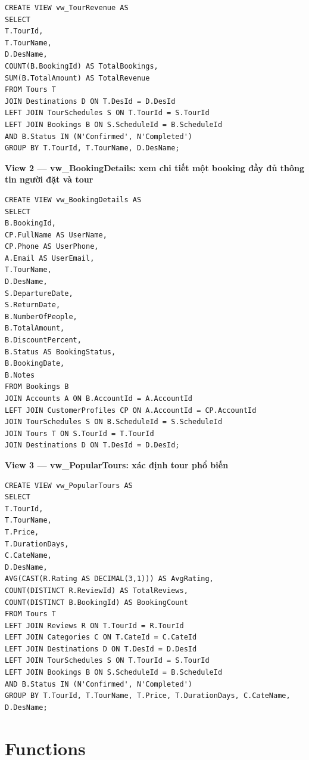 \begin{lstlisting}[style=sql, caption={vw\_TourRevenue}]
CREATE VIEW vw_TourRevenue AS
SELECT
T.TourId,
T.TourName,
D.DesName,
COUNT(B.BookingId) AS TotalBookings,
SUM(B.TotalAmount) AS TotalRevenue
FROM Tours T
JOIN Destinations D ON T.DesId = D.DesId
LEFT JOIN TourSchedules S ON T.TourId = S.TourId
LEFT JOIN Bookings B ON S.ScheduleId = B.ScheduleId
AND B.Status IN (N'Confirmed', N'Completed')
GROUP BY T.TourId, T.TourName, D.DesName;
\end{lstlisting}

\noindent\textbf{View 2 — vw\_BookingDetails: xem chi tiết một booking đầy đủ thông tin người đặt và tour}

\begin{lstlisting}[style=sql, caption={vw\_BookingDetails}]
CREATE VIEW vw_BookingDetails AS
SELECT
B.BookingId,
CP.FullName AS UserName,
CP.Phone AS UserPhone,
A.Email AS UserEmail,
T.TourName,
D.DesName,
S.DepartureDate,
S.ReturnDate,
B.NumberOfPeople,
B.TotalAmount,
B.DiscountPercent,
B.Status AS BookingStatus,
B.BookingDate,
B.Notes
FROM Bookings B
JOIN Accounts A ON B.AccountId = A.AccountId
LEFT JOIN CustomerProfiles CP ON A.AccountId = CP.AccountId
JOIN TourSchedules S ON B.ScheduleId = S.ScheduleId
JOIN Tours T ON S.TourId = T.TourId
JOIN Destinations D ON T.DesId = D.DesId;
\end{lstlisting}

\noindent\textbf{View 3 — vw\_PopularTours: xác định tour phổ biến}

\begin{lstlisting}[style=sql, caption={vw\_PopularTours}]
CREATE VIEW vw_PopularTours AS
SELECT
T.TourId,
T.TourName,
T.Price,
T.DurationDays,
C.CateName,
D.DesName,
AVG(CAST(R.Rating AS DECIMAL(3,1))) AS AvgRating,
COUNT(DISTINCT R.ReviewId) AS TotalReviews,
COUNT(DISTINCT B.BookingId) AS BookingCount
FROM Tours T
LEFT JOIN Reviews R ON T.TourId = R.TourId
LEFT JOIN Categories C ON T.CateId = C.CateId
LEFT JOIN Destinations D ON T.DesId = D.DesId
LEFT JOIN TourSchedules S ON T.TourId = S.TourId
LEFT JOIN Bookings B ON S.ScheduleId = B.ScheduleId
AND B.Status IN (N'Confirmed', N'Completed')
GROUP BY T.TourId, T.TourName, T.Price, T.DurationDays, C.CateName, D.DesName;
\end{lstlisting}

\section{Functions}\label{Sec2.5}

